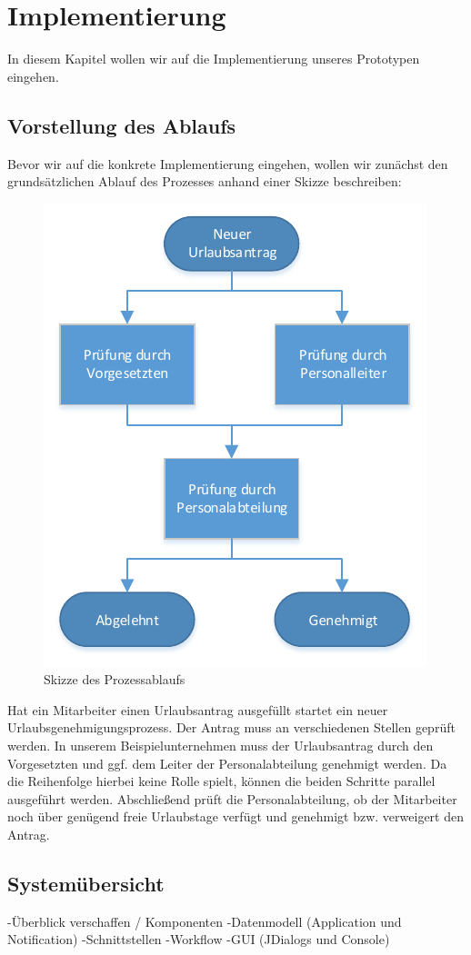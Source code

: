 \section{Implementierung}
In diesem Kapitel wollen wir auf die Implementierung unseres Prototypen eingehen.


\subsection{Vorstellung des Ablaufs}
Bevor wir auf die konkrete Implementierung eingehen, wollen wir zunächst den grundsätzlichen Ablauf des Prozesses anhand einer Skizze beschreiben:
\begin{figure}[H]
\centering
\includegraphics[width=0.5\linewidth]{Bilder/Workflow}
\caption{Skizze des Prozessablaufs}
\label{fig:Workflow}
\end{figure}

Hat ein Mitarbeiter einen Urlaubsantrag ausgefüllt startet ein neuer Urlaubsgenehmigungsprozess. Der Antrag muss an verschiedenen Stellen geprüft werden. In unserem Beispielunternehmen muss der Urlaubsantrag durch den Vorgesetzten und ggf. dem Leiter der Personalabteilung genehmigt werden. Da die Reihenfolge hierbei keine Rolle spielt, können die beiden Schritte parallel ausgeführt werden. Abschließend prüft die Personalabteilung, ob der Mitarbeiter noch über genügend freie Urlaubstage verfügt und genehmigt bzw. verweigert den Antrag.	
	
	
\subsection{Systemübersicht}
	-Überblick verschaffen / Komponenten
		-Datenmodell (Application und Notification)
		-Schnittstellen
		-Workflow
		-GUI (JDialogs und Console)

